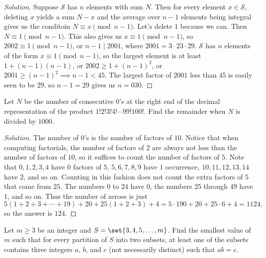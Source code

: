 \ifsolutions
\begin{proof}[Solution]
Suppose $\mathcal{S}$ has $n$ elements with sum $N$. Then for every element $x
\in \mathcal{S}$, deleting $x$ yields a sum $N - x$ and the average over $n - 1$
elements being integral gives us the conditoin $N \equiv x \pmod{n - 1}$. Let's
delete $1$ because we can. Then $N \equiv 1 \pmod{n - 1}$. This also gives us $x
\equiv 1 \pmod{n - 1}$, so $2002 \equiv 1 \pmod{n - 1}$, or $n - 1 \mid 2001$,
where $2001 = 3 \cdot 23 \cdot 29$. $\mathcal{S}$ has $n$ elements of the form
$x \equiv 1 \pmod{n - 1}$, so the largest element is at least $1 + (n - 1) (n -
1)$, or $2002 \geq 1 + (n - 1)^2$, or $2001 \geq (n - 1)^2 \implies n - 1 < 45$.
The largest factor of $2001$ less than $45$ is easily seen to be $29$, so $n - 1
= 29$ gives us $n = \boxed{030}$.
\end{proof}
\fi

\begin{prb}[2006 AIME I-4]
Let $N$ be the number of consecutive $0$'s at the right end of the decimal
representation of the product $1! 2! 3! 4! \cdots 99! 100!$. Find the remainder
when $N$ is divided by $1000$.
\end{prb}

\ifsolutions
\begin{proof}[Solution]
The number of $0$'s is the number of factors of $10$. Notice that when computing
factorials, the number of factors of $2$ are always not less than the number of
factors of $10$, so it suffices to count the number of factors of $5$. Note that
$0, 1, 2, 3, 4$ have $0$ factors of $5$, $5, 6, 7, 8, 9$ have $1$ occurrence,
$10, 11, 12, 13, 14$ have $2$, and so on. Counting in this fashion does not
count the extra factors of $5$ that come from $25$. The numbers $0$ to $24$ have
$0$, the numbers $25$ through $49$ have $1$, and so on. Thus the number of
zeroes is just
\[ 5(1 + 2 + 3 + \cdots + 19) + 20 + 25(1 + 2 + 3) + 4 = 5 \cdot 190 + 20 + 25
\cdot 6 + 4 = 1124, \]
so the answer is $\boxed{124}$.
\end{proof}
\fi

\begin{prb}[2010 AIME I-12]
Let $m \geq 3$ be an integer and $S = \set{3, 4, 5, \dots, m}$. Find the
smallest value of $m$ such that for every partition of $S$ into two subsets, at
least one of the subsets contains three integers $a$, $b$, and $c$ (not
necessarily distinct) such that $ab = c$.
\end{prb}

